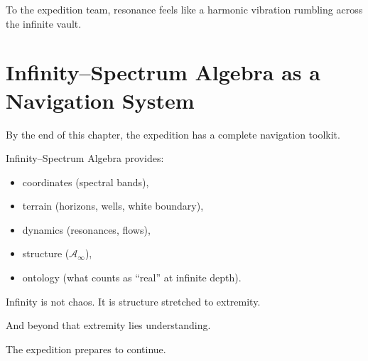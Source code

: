 To the expedition team, resonance feels like a harmonic vibration rumbling across the infinite vault.

\section{Infinity--Spectrum Algebra as a Navigation System}
By the end of this chapter, the expedition has a complete navigation toolkit.

Infinity--Spectrum Algebra provides:
\begin{itemize}
  \item coordinates (spectral bands),
  \item terrain (horizons, wells, white boundary),
  \item dynamics (resonances, flows),
  \item structure ($\mathcal{A}_\infty$),
  \item ontology (what counts as ``real'' at infinite depth).
\end{itemize}

Infinity is not chaos. It is structure stretched to extremity.

And beyond that extremity lies understanding.

The expedition prepares to continue.
